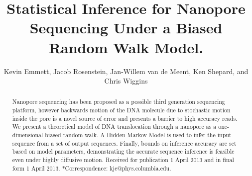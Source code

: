 \documentclass{biophys_letter}
\begin{document}
\setcounter{page}{1} %
\title{Statistical Inference for Nanopore Sequencing Under a Biased Random Walk Model.}

\author{Kevin Emmett,{\authdagger} Jacob Rosenstein, Jan-Willem van de Meent, Ken Shepard, and Chris Wiggins}

\address{{\addrdagger}Department of Physics and Department of Applied Physics and Applied Math, Columbia University, New York, New York; and School of Engineering, Brown University, Providence, Rhode Island}

\maketitle

\pagestyle{headings}



\begin{abstract}
{Nanopore sequencing has been proposed as a possible third generation sequencing platform, however backwards motion of the DNA molecule due to stochastic motion inside the pore is a novel source of error and presents a barrier to high accuracy reads.
We present a theoretical model of DNA translocation through a nanopore as a one-dimensional biased random walk.
A Hidden Markov Model is used to infer the input sequence from a set of output sequences.
Finally, bounds on inference accuracy are set based on model parameters, demonstrating the accurate sequence inference is feasible even under highly diffusive motion.}
{Received for publication 1 April 2013 and in final form 1 April 2013.}
{*Correspondence: kje@phys.columbia.edu.}
\end{abstract}

\vspace*{2.7pt}

\twocolumn

\end{document}
